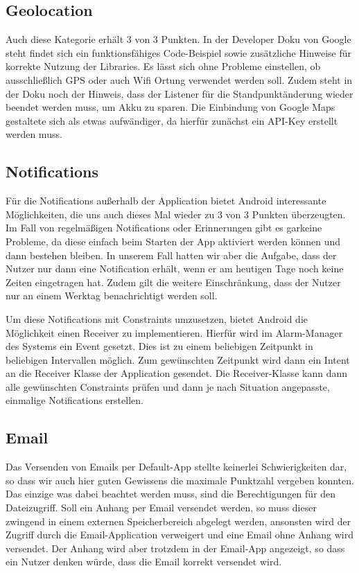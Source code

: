 \subsection{Geolocation}
Auch diese Kategorie erhält 3 von 3 Punkten. In der Developer Doku von Google steht findet sich ein funktionsfähiges Code-Beispiel sowie zusätzliche Hinweise für korrekte Nutzung der Libraries. Es lässt sich ohne Probleme einstellen, ob ausschließlich GPS oder auch Wifi Ortung verwendet werden soll. Zudem steht in der Doku noch der Hinweis, dass der Listener für die Standpunktänderung wieder beendet werden muss, um Akku zu sparen. Die Einbindung von Google Maps gestaltete sich als etwas aufwändiger, da hierfür zunächst ein API-Key erstellt werden muss.

\subsection{Notifications}
Für die Notifications außerhalb der Application bietet Android interessante Möglichkeiten, die uns auch dieses Mal wieder zu 3 von 3 Punkten überzeugten. Im Fall von regel\-mäßigen Notifications oder Erinnerungen gibt es garkeine Probleme, da diese einfach beim Starten der App aktiviert werden können und dann bestehen bleiben. In unserem Fall hatten wir aber die Aufgabe, dass der Nutzer nur dann eine Notification erhält, wenn er am heutigen Tage noch keine Zeiten eingetragen hat. Zudem gilt die weitere Einschränkung, dass der Nutzer nur an einem Werktag benachrichtigt werden soll.

Um diese Notifications mit Constraints umzusetzen, bietet Android die Möglichkeit einen Receiver zu implementieren. Hierfür wird im Alarm-Manager des Systems ein Event ge\-setzt. Dies ist zu einem beliebigen Zeitpunkt in beliebigen Intervallen möglich. Zum gewünschten Zeitpunkt wird dann ein Intent an die Receiver Klasse der Application gesendet. Die Receiver-Klasse kann dann alle gewünschten Constraints prü\-fen und dann je nach Situation angepasste, einmalige Notifications erstellen.

\subsection{Email}
Das Versenden von Emails per Default-App stellte keinerlei Schwierigkeiten dar, so dass wir auch hier guten Gewissens die maximale Punktzahl vergeben konnten. Das einzige was dabei beachtet werden muss, sind die Berechtigungen für den Dateizugriff. Soll ein Anhang per Email versendet werden, so muss dieser zwingend in einem externen Speicherbereich abgelegt werden, ansonsten wird der Zugriff durch die Email-Application verweigert und eine Email ohne Anhang wird versendet. Der Anhang wird aber trotzdem in der Email-App angezeigt, so dass ein Nutzer denken würde, dass die Email korrekt versendet wird.


